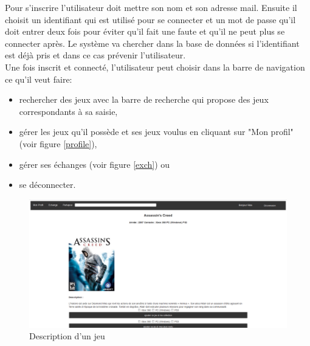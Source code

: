 \documentclass[a4paper,12pt,abstracton,titlepage]{scrartcl}
\begin{document}
Pour s'inscrire l'utilisateur doit mettre son nom et son adresse mail. Ensuite il choisit un identifiant qui est utilisé pour se connecter et un mot de passe qu'il doit entrer deux fois pour éviter qu'il fait une faute et qu'il ne peut plus se connecter après. Le système va chercher dans la base de données si l'identifiant est déjà pris et dans ce cas prévenir l'utilisateur.\\
Une fois inscrit et connecté, l'utilisateur peut choisir dans la barre de navigation ce qu'il veut faire:\\
\begin{itemize}
\item rechercher des jeux avec la barre de recherche qui propose des jeux correspondants à sa saisie,
\item gérer les jeux qu'il possède et ses jeux voulus en cliquant sur "Mon profil" (voir figure \ref{profile}),
\item gérer ses échanges (voir figure \ref{exch}) ou
\item se déconnecter.\\
\end{itemize}

\begin{figure}[h]
  \centering
    \includegraphics[width=\textwidth]{./doc/05_description_jeu.png}
	\caption{Description d'un jeu}
	\label{jeu}
\end{figure}
\end{document}
